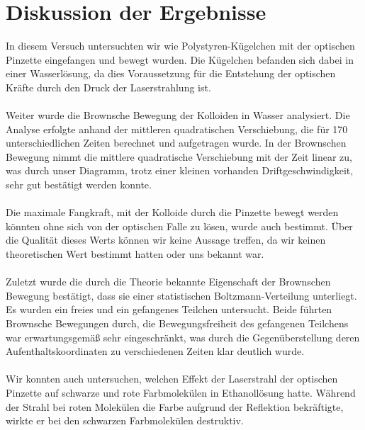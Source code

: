 \documentclass[a4paper,titlepage]{scrartcl}
\numberwithin{equation}{section}
\begin{document}
\section{Diskussion der Ergebnisse}
In diesem Versuch untersuchten wir wie Polystyren-Kügelchen mit der optischen Pinzette eingefangen und bewegt wurden. Die Kügelchen befanden sich dabei in einer Wasserlösung, da dies Voraussetzung für die Entstehung der optischen Kräfte durch den Druck der Laserstrahlung ist.\\ \\
Weiter wurde die Brownsche Bewegung der Kolloiden in Wasser analysiert. Die Analyse erfolgte anhand der mittleren quadratischen Verschiebung, die für 170 unterschiedlichen Zeiten berechnet und aufgetragen wurde. In der Brownschen Bewegung nimmt die mittlere quadratische Verschiebung mit der Zeit linear zu, was durch unser Diagramm, trotz einer kleinen vorhanden Driftgeschwindigkeit, sehr gut bestätigt werden konnte.\\ \\
Die maximale Fangkraft, mit der Kolloide durch die Pinzette bewegt werden könnten ohne sich von der optischen Falle zu lösen, wurde auch bestimmt. Über die Qualität dieses Werts können wir keine Aussage treffen, da wir keinen theoretischen Wert bestimmt hatten oder uns bekannt war.\\ \\
Zuletzt wurde die durch die Theorie bekannte Eigenschaft der Brownschen Bewegung bestätigt, dass sie einer statistischen Boltzmann-Verteilung unterliegt. Es wurden ein freies und ein gefangenes Teilchen untersucht. Beide führten Brownsche Bewegungen durch, die Bewegungsfreiheit des gefangenen Teilchens war erwartungsgemäß sehr eingeschränkt, was durch die Gegenüberstellung deren Aufenthaltskoordinaten zu verschiedenen Zeiten klar deutlich wurde.\\ \\
Wir konnten auch untersuchen, welchen Effekt der Laserstrahl der optischen Pinzette auf schwarze und rote Farbmolekülen in Ethanollösung hatte. Während der Strahl bei roten Molekülen die Farbe aufgrund der Reflektion bekräftigte, wirkte er bei den schwarzen Farbmolekülen destruktiv.


\end{document}
